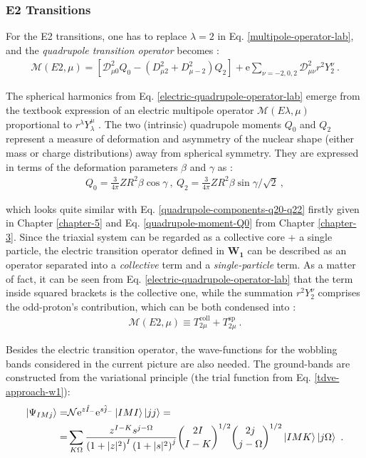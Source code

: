 \subsubsection{E2 Transitions}

For the E2 transitions, one has to replace $\lambda=2$ in Eq. \ref{multipole-operator-lab}, and the \emph{quadrupole transition operator} becomes \cite{toki1975asymmetric,raduta2020towards}:
\begin{align}
    \mathcal{M}(E2,\mu)=\left[\mathcal{D}_{\mu0}^2Q_0-\left(D_{\mu 2}^2+D_{\mu -2}^2\right)Q_2\right]+\mathrm{e}\sum_{\nu=-2,0,2}\mathcal{D}_{\mu\nu}^2r^2Y_2^\nu\ .
    \label{electric-quadrupole-operator-lab}
\end{align}

The spherical harmonics from Eq. \ref{electric-quadrupole-operator-lab} emerge from the textbook expression of an electric multipole operator $\mathcal{M}(E\lambda,\mu)$ proportional to $r^\lambda Y_\lambda^\mu$  \cite{heyde1994nuclear}. The two (intrinsic) quadrupole moments $Q_{0}$ and $Q_{2}$ represent a measure of deformation and asymmetry of the nuclear shape (either mass or charge distributions) away from spherical symmetry. They are expressed in terms of the deformation parameters $\beta$ and $\gamma$ as \cite{raduta2018wobbling}:
\begin{align}
    Q_{0}=\frac{3}{4\pi}ZR^2\beta\cos\gamma\ ,\ Q_{2}=\frac{3}{4\pi}ZR^2\beta\sin\gamma/\sqrt{2}\ ,
    \label{quadrupole-components-Q0-Q2}
\end{align}

which looks quite similar with Eq. \ref{quadrupole-components-q20-q22} firstly given in Chapter \ref{chapter-5} and Eq. \ref{quadrupole-moment-Q0} from Chapter \ref{chapter-3}. Since the triaxial system can be regarded as a collective core + a single particle, the electric transition operator defined in $\mathbf{W_1}$ can be described as an operator separated into a \emph{collective} term and a \emph{single-particle} term. As a matter of fact, it can be seen from Eq. \ref{electric-quadrupole-operator-lab} that the term inside squared brackets is the collective one, while the summation $r^2Y_2^\nu$ comprises the odd-proton's contribution, which can be both condensed into \cite{raduta2020approach}:
\begin{align}
    \mathcal{M}(E2,\mu)\equiv T_{2\mu}^\text{coll}+T_{2\mu}^\text{sp}\ .
    \label{quadrupole-transition-operator-terms}
\end{align}

Besides the electric transition operator, the wave-functions for the wobbling bands considered in the current picture are also needed. The ground-bands are constructed from the variational principle (the trial function from Eq. \ref{tdve-approach-w1}):
\begin{align}
    \ket{\Psi_{IMj}}=&\mathcal{N}\mathrm{e}^{z\hat{I}_-}\mathrm{e}^{s\hat{j}_-}\ket{IMI}\ket{jj}=\nonumber\\
    =&\sum_{K\Omega}\frac{z^{I-K}s^{j-\Omega}}{\left(1+|z|^2\right)^I\left(1+|s|^2\right)^j}\binom{2I}{I-K}^{1/2}\binom{2j}{j-\Omega}^{1/2}\ket{IMK}\ket{j\Omega}\ .
    \label{wave-function-TSD1}
\end{align}

